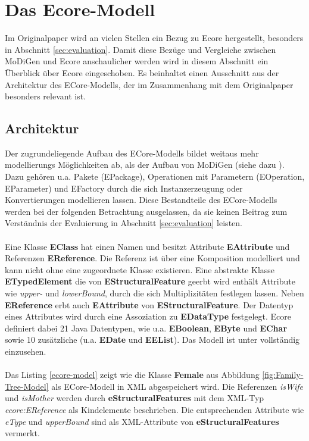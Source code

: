 \section{Das Ecore-Modell}
Im Originalpaper \cite{gerhart2015approach} wird an vielen Stellen ein Bezug zu Ecore hergestellt, besonders in Abschnitt \ref{sec:evaluation}. Damit diese Bezüge und Vergleiche zwischen MoDiGen und Ecore anschaulicher werden wird in diesem Abschnitt ein Überblick über Ecore eingeschoben. Es beinhaltet einen Ausschnitt aus der Architektur des ECore-Modells, der im Zusammenhang mit dem Originalpaper besonders relevant ist.


\subsection{Architektur}
Der zugrundeliegende Aufbau des ECore-Modells bildet weitaus mehr modellierungs Möglichkeiten ab, als der Aufbau von MoDiGen (siehe dazu \cite{eclipse_ecore}). Dazu gehören u.a. Pakete (EPackage), Operationen mit Parametern (EOperation, EParameter) und EFactory durch die sich Instanzerzeugung oder Konvertierungen modellieren lassen. Diese Bestandteile des ECore-Modells werden bei der folgenden Betrachtung ausgelassen, da sie keinen Beitrag zum Verständnis der Evaluierung in Abschnitt \ref{sec:evaluation} leisten.\\
\\
Eine Klasse \textbf{EClass} hat einen Namen und besitzt Attribute \textbf{EAttribute} und Referenzen \textbf{EReference}. Die Referenz ist über eine Komposition modelliert und kann nicht ohne eine zugeordnete Klasse existieren. Eine abstrakte Klasse \textbf{ETypedElement} die von \textbf{EStructuralFeature} geerbt wird enth\"alt Attribute wie \textit{upper-} und \textit{lowerBound}, durch die sich Multiplizitäten festlegen lassen. Neben \textbf{EReference} erbt auch \textbf{EAttribute} von \textbf{EStructuralFeature}. Der Datentyp eines Attributes wird durch eine Assoziation zu \textbf{EDataType} festgelegt. Ecore definiert dabei 21 Java Datentypen, wie u.a. \textbf{EBoolean}, \textbf{EByte} und \textbf{EChar} sowie 10 zus\"atzliche (u.a. \textbf{EDate} und \textbf{EEList}). Das Modell ist unter \cite{eclipse_core} vollst\"andig einzusehen.\\
\\
Das Listing \ref{ecore-model} zeigt wie die Klasse \textbf{Female} aus Abbildung \ref{fig:Family-Tree-Model} als ECore-Modell in XML abgespeichert wird. Die Referenzen \textit{isWife} und \textit{isMother} werden durch \textbf{eStructuralFeatures} mit dem XML-Typ \textit{ecore:EReference} als Kindelemente beschrieben. Die entsprechenden Attribute wie \textit{eType} und \textit{upperBound} sind als XML-Attribute von \textbf{eStructuralFeatures} vermerkt.


